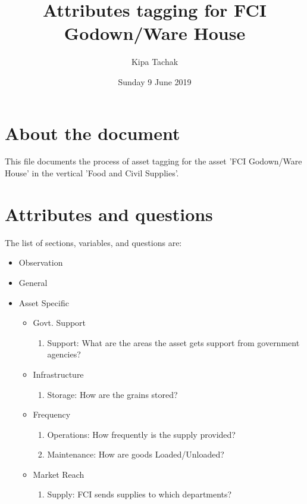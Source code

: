 \documentclass[oneside,twocolumn]{article}
\title{Attributes tagging for FCI Godown/Ware House}
\author{Kipa Tachak}
\date{Sunday  9 June 2019}
\begin{document}
\maketitle

\section{About the document}
This file documents the process of asset tagging for the asset 'FCI Godown/Ware House' in the
vertical 'Food and Civil Supplies'.

\section{Attributes and questions}
The list of sections, variables, and questions are:
    \begin{itemize}
    \item Observation
    \item General
    \item Asset Specific
    \begin{itemize}
\item Govt. Support
\begin{enumerate}
\item Support: What are the areas the asset gets support from government agencies?
\end{enumerate}

\item Infrastructure
\begin{enumerate}
\item Storage: How are the grains stored?
\end{enumerate}

\item Frequency
\begin{enumerate}
\item Operations: How frequently is the supply provided?
\item Maintenance: How are goods Loaded/Unloaded?
\end{enumerate}

\item Market Reach
\begin{enumerate}
\item Supply: FCI sends supplies to which departments?
\end{enumerate}

\end{itemize}

    \end{itemize}
\end{document}

